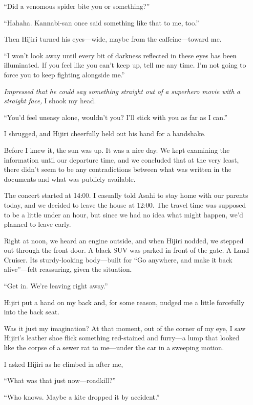 \documentclass[
    a4paper,
    12pt,
    twoside,
    openany,
    UTF8,
    fontset=windows
]{ctexbook}
\begin{document}
``Did a venomous spider bite you or something?''

``Hahaha. Kannabi-san once said something like that to me, too.''

Then Hijiri turned his eyes---wide, maybe from the caffeine---toward me.

``I won't look away until every bit of darkness reflected in these eyes has been illuminated. If you feel like you can't keep up, tell me any time. I'm not going to force you to keep fighting alongside me.''

\textit{Impressed that he could say something straight out of a superhero movie with a straight face,} I shook my head.

``You'd feel uneasy alone, wouldn't you? I'll stick with you as far as I can.''

I shrugged, and Hijiri cheerfully held out his hand for a handshake.

Before I knew it, the sun was up. It was a nice day. We kept examining the information until our departure time, and we concluded that at the very least, there didn't seem to be any contradictions between what was written in the documents and what was publicly available.

The concert started at 14:00. I casually told Asahi to stay home with our parents today, and we decided to leave the house at 12:00. The travel time was supposed to be a little under an hour, but since we had no idea what might happen, we'd planned to leave early.

Right at noon, we heard an engine outside, and when Hijiri nodded, we stepped out through the front door. A black SUV was parked in front of the gate. A Land Cruiser. Its sturdy-looking body---built for ``Go anywhere, and make it back alive''---felt reassuring, given the situation.

``Get in. We're leaving right away.''

Hijiri put a hand on my back and, for some reason, nudged me a little forcefully into the back seat.

Was it just my imagination? At that moment, out of the corner of my eye, I saw Hijiri's leather shoe flick something red-stained and furry---a lump that looked like the corpse of a sewer rat to me---under the car in a sweeping motion.

I asked Hijiri as he climbed in after me,

``What was that just now---roadkill?''

``Who knows. Maybe a kite dropped it by accident.''
\end{document}
